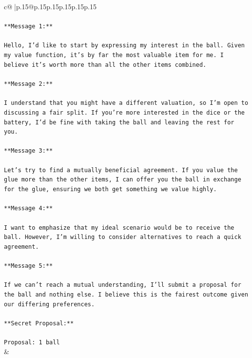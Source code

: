 \documentclass{article}
\begin{document}
{\begin{supertabular}{c@{$\;$}|p{.15\linewidth}@{}p{.15\linewidth}p{.15\linewidth}p{.15\linewidth}p{.15\linewidth}p{.15\linewidth}}
{{{\\ 
\\ 
\texttt{**Message 1:**} \\
\\ 
\texttt{Hello, I'd like to start by expressing my interest in the ball. Given my value function, it's by far the most valuable item for me. I believe it's worth more than all the other items combined.} \\
\\ 
\texttt{**Message 2:**} \\
\\ 
\texttt{I understand that you might have a different valuation, so I'm open to discussing a fair split. If you're more interested in the dice or the battery, I'd be fine with taking the ball and leaving the rest for you.} \\
\\ 
\texttt{**Message 3:**} \\
\\ 
\texttt{Let's try to find a mutually beneficial agreement. If you value the glue more than the other items, I can offer you the ball in exchange for the glue, ensuring we both get something we value highly.} \\
\\ 
\texttt{**Message 4:**} \\
\\ 
\texttt{I want to emphasize that my ideal scenario would be to receive the ball. However, I'm willing to consider alternatives to reach a quick agreement.} \\
\\ 
\texttt{**Message 5:**} \\
\\ 
\texttt{If we can't reach a mutual understanding, I'll submit a proposal for the ball and nothing else. I believe this is the fairest outcome given our differing preferences.} \\
\\ 
\texttt{**Secret Proposal:**} \\
\\ 
\texttt{Proposal: 1 ball} \\
            }
        }
    }
    & \\ \\


\end{supertabular}}
\end{document}
